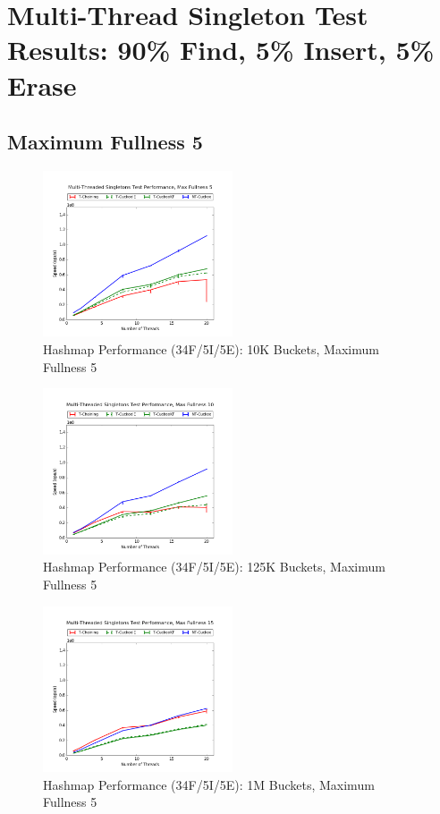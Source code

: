 \newpage
\section{Multi-Thread Singleton Test Results: 90\% Find, 5\% Insert, 5\% Erase}

\subsection{Maximum Fullness 5}

\begin{figure}[H]
    \centering
    \caption{Hashmap Performance (34F/5I/5E): 10K Buckets, Maximum Fullness 5}
    \includegraphics[width=0.5\textwidth]{maps/5HM10K:F90,I5,E5.png} 
    
\end{figure}

\begin{figure}[H]
    \centering
    \caption{Hashmap Performance (34F/5I/5E): 125K Buckets, Maximum Fullness 5}
    \includegraphics[width=0.5\textwidth]{maps/10HM125K:F90,I5,E5.png} 
    
\end{figure}

\begin{figure}[H]
    \centering
    \caption{Hashmap Performance (34F/5I/5E): 1M Buckets, Maximum Fullness 5}
    \includegraphics[width=0.5\textwidth]{maps/15HM1M:F90,I5,E5.png} 
    
\end{figure}

